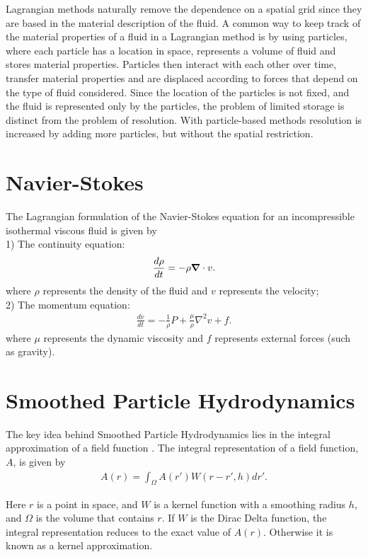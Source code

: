 Lagrangian methods naturally remove the dependence on a spatial grid since they
are based in the material description of the fluid. A common way to keep track
of the material properties of a fluid in a Lagrangian method is by using
particles, where each particle has a location in space, represents a volume of
fluid and stores material properties. Particles then interact with each other
over time, transfer material properties and are displaced according to forces
that depend on the type of fluid considered. Since the location of the
particles is not fixed, and the fluid is represented only by the particles, the
problem of limited storage is distinct from the problem of resolution. With
particle-based methods resolution is increased by adding more particles, but
without the spatial restriction.


\section{Navier-Stokes}

The Lagrangian formulation of the Navier-Stokes equation for an incompressible
isothermal viscous fluid is given by\\
1) The continuity equation:
\begin{align}
\frac{d\rho}{dt} = -\rho \mbox{\boldmath$ \nabla $} \cdot v.
\end{align}
where $\rho$ represents the density of the fluid and $v$ represents the velocity;\\


2) The momentum equation:
\begin{align}
\frac{dv}{dt} = -\frac{1}{\rho}P + \frac{\mu}{\rho} \nabla^2 v + f.
\end{align}
where $\mu$ represents the dynamic viscosity and $f$ represents external forces (such as gravity).


\section{Smoothed Particle Hydrodynamics}


The key idea behind Smoothed Particle Hydrodynamics lies in the integral
approximation of a field function \cite{Monaghan2005}.
The integral representation of a field
function, $A$, is given by 
\begin{align}
A(r) = \int_\Omega A(r')W(r-r', h)dr'.
\end{align}

Here $r$ is a point in space, and $W$ is a kernel function with a smoothing radius
$h$, and $\Omega$ is the volume that contains $r$. If $W$ is the Dirac Delta
function, the integral representation reduces to the exact value of $A(r)$.
Otherwise it is known as a kernel approximation.

